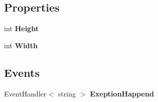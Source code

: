\subsection*{Properties}
\begin{DoxyCompactItemize}
\item 
\mbox{\label{class_home_work_1_1_task_library_1_1_tasks_1_1_lesson6_1_1_task1_1_1_classes_1_1_rectangle_ad81437516803ef0097a7bd34302ce764}} 
int {\bfseries Height}
\item 
\mbox{\label{class_home_work_1_1_task_library_1_1_tasks_1_1_lesson6_1_1_task1_1_1_classes_1_1_rectangle_ad63299392633d10785f12b16ca8a7836}} 
int {\bfseries Width}
\end{DoxyCompactItemize}
\subsection*{Events}
\begin{DoxyCompactItemize}
\item 
\mbox{\label{class_home_work_1_1_task_library_1_1_tasks_1_1_lesson6_1_1_task1_1_1_classes_1_1_rectangle_a21a58ff4992eb6f6adfe4c8af6e0c272}} 
Event\+Handler$<$ string $>$ {\bfseries Exeption\+Happend}
\end{DoxyCompactItemize}
